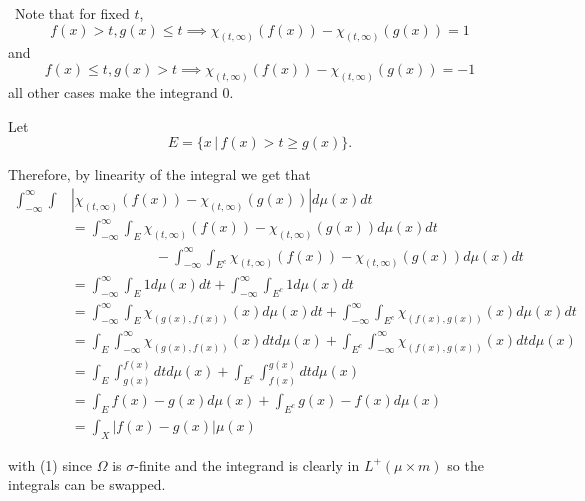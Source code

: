 \documentclass[12pt]{Homework}
\begin{document}
\begin{solution}$\,$
Note that for fixed $t$, $$f(x)>t,g(x)\le t\implies \chi_{(t,\infty)}(f(x))-\chi_{(t,\infty)}(g(x))=1$$ and $$f(x)\le t,g(x)>t\implies \chi_{(t,\infty)}(f(x))-\chi_{(t,\infty)}(g(x))=-1$$ all other cases make the integrand $0$.

Let $$E=\{x\,|\, f(x)>t\ge g(x)\}.$$

Therefore, by linearity of the integral we get that
\begin{align*}
    \int_{-\infty}^\infty\int&\left|\chi_{(t,\infty)}(f(x))-\chi_{(t,\infty)}(g(x))\right|d\mu(x)dt\\
    &=\int_{-\infty}^\infty\int_E\chi_{(t,\infty)}(f(x))-\chi_{(t,\infty)}(g(x))d\mu(x)dt\\
    &\qquad\qquad\qquad-\int_{-\infty}^\infty\int_{E^c}\chi_{(t,\infty)}(f(x))-\chi_{(t,\infty)}(g(x))d\mu(x)dt\\
    &=\int_{-\infty}^\infty\int_E1d\mu(x)dt+\int_{-\infty}^\infty\int_{E^c}1d\mu(x)dt\\
    &=\int_{-\infty}^\infty\int_E\chi_{(g(x),f(x))}(x)d\mu(x)dt+\int_{-\infty}^\infty\int_{E^c}\chi_{(f(x),g(x))}(x)d\mu(x)dt\\
    &=\int_E\int_{-\infty}^\infty\chi_{(g(x),f(x))}(x)dtd\mu(x)+\int_{E^c}\int_{-\infty}^\infty\chi_{(f(x),g(x))}(x)dtd\mu(x)\\
    &=\int_E\int_{g(x)}^{f(x)}dtd\mu(x)+\int_{E^c}\int_{f(x)}^{g(x)}dtd\mu(x)\\
    &=\int_Ef(x)-g(x)d\mu(x)+\int_{E^c}g(x)-f(x)d\mu(x)\\
    &=\int_X|f(x)-g(x)|\mu(x)
\end{align*}

with (1) since $\Omega$ is $\sigma$-finite and the integrand is clearly in $L^+(\mu\times m)$ so the integrals can be swapped. 
\end{solution}
\vspace{0.5cm}
\end{document}
